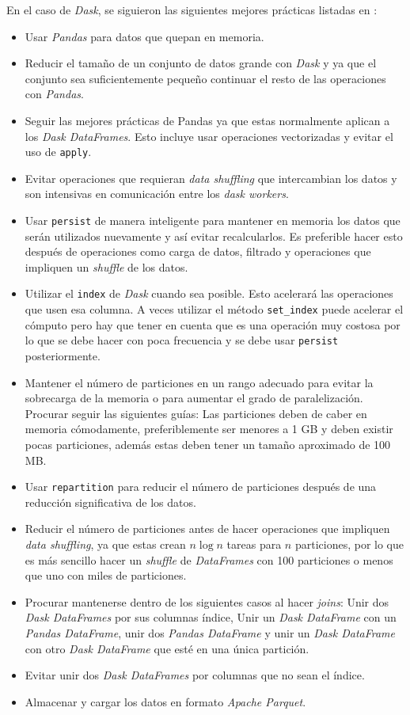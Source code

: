 En el caso de \textit{Dask}, se siguieron las siguientes mejores prácticas listadas en \cite{daskbestpractices}:
\begin{itemize}
	\item Usar \textit{Pandas} para datos que quepan en memoria.
	\item Reducir el tamaño de un conjunto de datos grande con \textit{Dask} y ya que el conjunto sea suficientemente pequeño continuar el resto de las operaciones con \textit{Pandas}.
	\item Seguir las mejores prácticas de Pandas ya que estas normalmente aplican a los \textit{Dask DataFrames}. Esto incluye usar operaciones vectorizadas y evitar el uso de \texttt{apply}.
	\item Evitar operaciones que requieran \textit{data shuffling} que intercambian los datos y son intensivas en comunicación entre los \textit{dask workers}. 
	\item Usar \texttt{persist} de manera inteligente para mantener en memoria los datos que serán utilizados nuevamente y así evitar recalcularlos. Es preferible hacer esto después de operaciones como carga de datos, filtrado y operaciones que impliquen un \textit{shuffle} de los datos.
	\item Utilizar el \texttt{index} de \textit{Dask} cuando sea posible. Esto acelerará las operaciones que usen esa columna. A veces utilizar el método \texttt{set\_index} puede acelerar el cómputo pero hay que tener en cuenta que es una operación muy costosa por lo que se debe hacer con poca frecuencia y se debe usar \texttt{persist} posteriormente.
	\item Mantener el número de particiones en un rango adecuado para evitar la sobrecarga de la memoria o para aumentar el grado de paralelización. Procurar seguir las siguientes guías: Las particiones deben de caber en memoria cómodamente, preferiblemente ser menores a 1 GB y deben existir pocas particiones, además estas deben tener un tamaño aproximado de 100 MB. 
	\item Usar \texttt{repartition} para reducir el número de particiones después de una reducción significativa de los datos.
	\item Reducir el número de particiones antes de hacer operaciones que impliquen \textit{data shuffling}, ya que estas crean $n \log{n}$ tareas para $n$ particiones, por lo que es más sencillo hacer un \textit{shuffle} de \textit{DataFrames} con 100 particiones o menos que uno con miles de particiones.
	\item Procurar mantenerse dentro de los siguientes casos al hacer \textit{joins}: Unir dos \textit{Dask DataFrames} por sus columnas índice, Unir un \textit{Dask DataFrame} con un \textit{Pandas DataFrame}, unir dos \textit{Pandas DataFrame} y unir un \textit{Dask DataFrame} con otro \textit{Dask DataFrame} que esté en una única partición. 
	\item Evitar unir dos \textit{Dask DataFrames} por columnas que no sean el índice.
	\item Almacenar y cargar los datos en formato \textit{Apache Parquet}.
\end{itemize}

